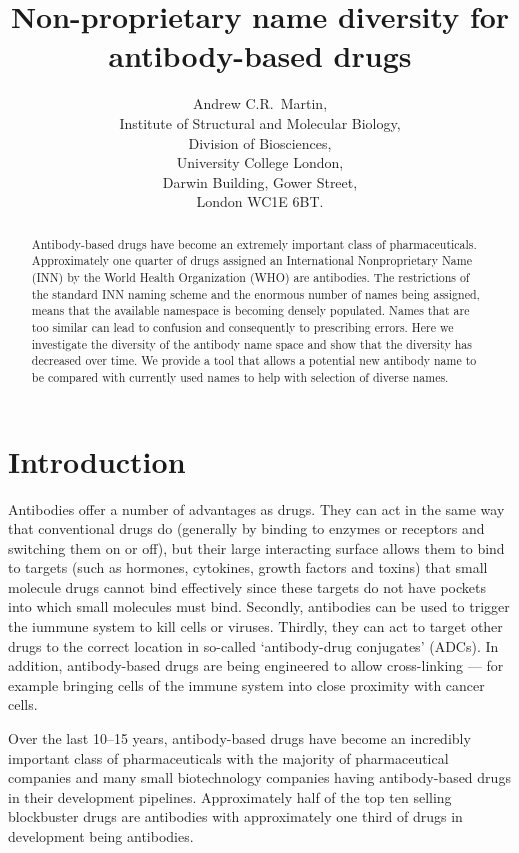 \documentclass{article}
\title{Non-proprietary name diversity for antibody-based drugs}
\author{Andrew C.R.\ Martin,\\Institute of Structural and Molecular
  Biology,\\Division of Biosciences,\\University College
  London,\\Darwin Building, Gower Street,\\London WC1E 6BT.}
\begin{document}
\maketitle

\begin{abstract}
Antibody-based drugs have become an extremely important class of
pharmaceuticals. Approximately one quarter of drugs assigned an
International Nonproprietary Name (INN) by the World Health
Organization (WHO) are antibodies.  The restrictions of the standard
INN naming scheme and the enormous number of names being assigned,
means that the available namespace is becoming densely populated.
Names that are too similar can lead to confusion and consequently to
prescribing errors. Here we investigate the diversity of the antibody
name space and show that the diversity has decreased over time. We
provide a tool that allows a potential new antibody name to be
compared with currently used names to help with selection of diverse
names.
\end{abstract}

\section{Introduction}
Antibodies offer a number of advantages as drugs. They can act in the
same way that conventional drugs do (generally by binding to enzymes
or receptors and switching them on or off), but their large
interacting surface allows them to bind to targets (such as hormones,
cytokines, growth factors and toxins) that small molecule drugs cannot
bind effectively since these targets do not have pockets into which small
molecules must bind. Secondly, antibodies can be used to trigger the
iummune system to kill cells or viruses. Thirdly, they can act to
target other drugs to the correct location in so-called `antibody-drug
conjugates' (ADCs). In addition, antibody-based drugs are being
engineered to allow cross-linking --- for example bringing cells of
the immune system into close proximity with cancer cells.

Over the last 10--15 years, antibody-based drugs have become an
incredibly important class of pharmaceuticals with the majority of
pharmaceutical companies and many small biotechnology companies having
antibody-based drugs in their development
pipelines\cite{xxx}. Approximately half of the top ten selling
blockbuster drugs are antibodies\cite{xxx} with approximately one
third of drugs in development being antibodies\cite{xxx}.
\end{document}
